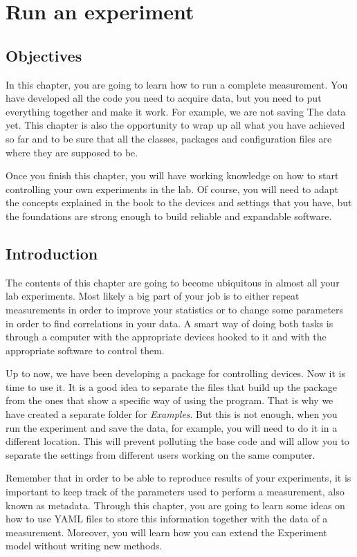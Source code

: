 \chapter{Run an experiment}\label{chapter:run-experiment}

\section{Objectives}
In this chapter, you are going to learn how to run a complete measurement. You have developed all the code you need to acquire data, but you need
to put everything together and make it work. For example, we are not saving The data yet. This chapter is also the opportunity to wrap up all what you have achieved so far and to be sure that all the classes, packages and configuration files are where
they are supposed to be.

Once you finish this chapter, you will have working knowledge on how to start controlling your own experiments in the lab. Of course, you will
need to adapt the concepts explained in the book to the devices and settings that you have, but the foundations are strong enough to build
reliable and expandable software.

\section{Introduction}
The contents of this chapter are going to become ubiquitous in almost all your lab experiments. Most likely a big part of your job is to either repeat measurements in order to improve your statistics or to change some parameters in order to find correlations in your data. A smart way of doing both tasks is through a computer with the appropriate devices hooked to it and with the appropriate software to control them.

Up to now, we have been developing a package for controlling devices. Now it is time to use it. It is a good idea to separate the files that build up the package from the ones that show a specific way of using the program. That is why we have created a separate folder for \emph{Examples}. But this is not enough, when you run the experiment and save the data, for example, you will need to do it in a different location. This will prevent polluting the base code and will allow you to separate the settings from different users working on the same computer.

Remember that in order to be able to reproduce results of your experiments, it is important to keep track of the parameters used to
perform a measurement, also known as metadata. Through this chapter, you are going to learn some ideas on how to use {YAML} files to store this information together with the data of a measurement. Moreover, you will learn how you can extend the Experiment model without writing new methods.

